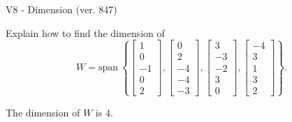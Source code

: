 \begin{exercise}
  \begin{exerciseTitle}V8 - Dimension (ver. 847)\end{exerciseTitle}
  \begin{exerciseStatement}
    Explain how to find the dimension of 
\[W=\mathrm{span}\ \left\{\left[\begin{array}{r}
1 \\
0 \\
-1 \\
0 \\
2
\end{array}\right] , \left[\begin{array}{r}
0 \\
2 \\
-4 \\
-4 \\
-3
\end{array}\right] , \left[\begin{array}{r}
3 \\
-3 \\
-2 \\
3 \\
0
\end{array}\right] , \left[\begin{array}{r}
-4 \\
3 \\
1 \\
3 \\
2
\end{array}\right]\right\}.\]



  \end{exerciseStatement}
  \begin{exerciseAnswer}
   The dimension of \(W\) is  \(4\).
  


  \end{exerciseAnswer}
\end{exercise}
